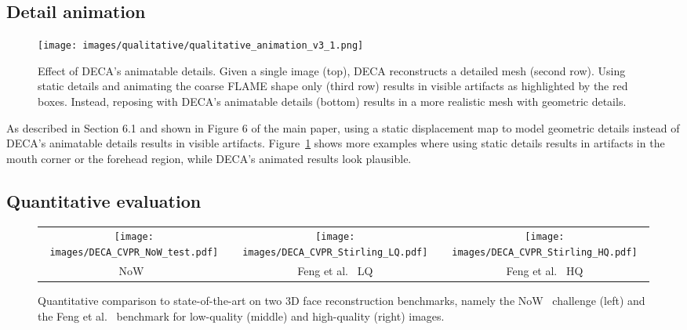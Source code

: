 \documentclass[final]{cvpr}
\newcommand{\modelname}{DECA\xspace}
\begin{document}
\begin{appendices}
\subsection{Detail animation}

\begin{figure}[ht]
	\centering
        \texttt{[image: images/qualitative/qualitative\_animation\_v3\_1.png]}
	\caption{Effect of \modelname's animatable details. Given a single image (top), \modelname reconstructs a detailed mesh (second row). Using static details and animating the coarse FLAME shape only (third row) results in visible artifacts as highlighted by the red boxes. Instead, reposing with \modelname's animatable details (bottom) results in a more realistic mesh with geometric details.}
	\label{fig:animation1}
\end{figure}

As described in Section 6.1 and shown in Figure 6 of the main paper, using a static displacement map to model geometric details instead of \modelname's animatable details results in visible artifacts.
Figure~\ref{fig:animation1} shows more examples where using static details results in artifacts in the mouth corner or the forehead region, while  \modelname's animated results look plausible. 



\subsection{Quantitative evaluation}

\begin{figure*}[t]
    \begin{tabular}{c@{}c@{}c}
        \texttt{[image: images/DECA\_CVPR\_NoW\_test.pdf]} &  
        \texttt{[image: images/DECA\_CVPR\_Stirling\_LQ.pdf]} & 
        \texttt{[image: images/DECA\_CVPR\_Stirling\_HQ.pdf]} \\
         NoW~\cite{Sanyal2019} &
         Feng et al.~\cite{Feng2018evaluation} LQ &
         Feng et al.~\cite{Feng2018evaluation} HQ
    \end{tabular}
	\caption{Quantitative comparison to state-of-the-art on two 3D face reconstruction benchmarks, namely the NoW~\cite{Sanyal2019} challenge (left) and the Feng et al.~\cite{Feng2018evaluation} benchmark for low-quality (middle) and high-quality (right) images.}
	\label{fig:cumulative_error}
\end{figure*}


\end{appendices}
\end{document}
